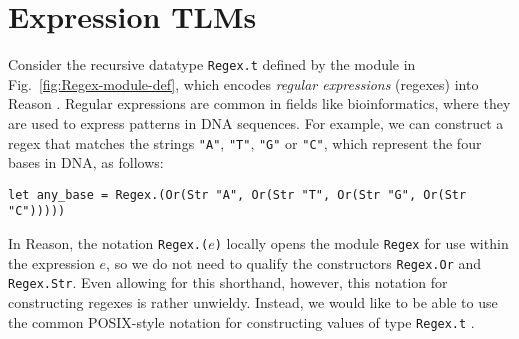 \documentclass[acmsmall,review,anonymous]{acmart}\settopmatter{printfolios=true,printccs=false,printacmref=false}
\newcommand{\li}[1]{\lstinline[basicstyle=\ttfamily\fontsize{9pt}{1em}\selectfont]{#1}}
\begin{document}
\vspace{-3px}
\newcommand{\seTLMsSec}{Expression TLMs}
\section{\protect\seTLMsSec}
\label{sec:setsms}
\vspace{-2px}

Consider the recursive datatype \li{Regex.t} defined by the module in Fig.~\ref{fig:Regex-module-def}, which encodes \emph{regular expressions} (regexes) into Reason \cite{Thompson:1968:PTR:363347.363387}. Regular expressions are  common in fields like bioinformatics, where they are used to express patterns in DNA sequences. For example, we can construct a regex that matches the strings \li{"A"}, \li{"T"}, \li{"G"} or \li{"C"}, which represent the four bases in DNA, as follows:
\begin{lstlisting}[numbers=none]
  let any_base = Regex.(Or(Str "A", Or(Str "T", Or(Str "G", Or(Str "C")))))
\end{lstlisting}
In Reason, the notation \li{Regex.(}$e$\li{)} locally opens the module \li{Regex} for use within the expression $e$, so we do not need to qualify the constructors \li{Regex.Or} and \li{Regex.Str}. Even allowing for this shorthand, however, this notation for constructing regexes is rather unwieldy. Instead, we would like to be able to use the common POSIX-style notation for constructing values of type \li{Regex.t} \cite{STD95954}.

\end{document}
